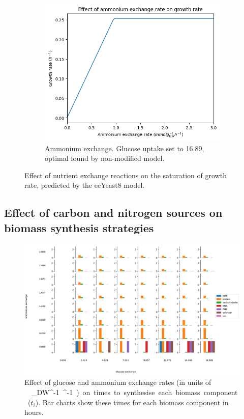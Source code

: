 \begin{figure}
  \begin{subfigure}[htpb]{0.6\textwidth}
  \centering
    \includegraphics[width=\linewidth]{ecYeast8-ammonium-saturation.png}
    \caption{
      Ammonium exchange.
      Glucose uptake set to 16.89, optimal found by non-modified model.}
    \label{fig:model-saturation-ammonium}
  \end{subfigure}
  \caption{
    Effect of nutrient exchange reactions on the saturation of growth rate, predicted by the ecYeast8 model.
  }
  \label{fig:model-saturation}
\end{figure}


\subsection{Effect of carbon and nitrogen sources on biomass synthesis strategies}
\label{subsec:model-grid}

\begin{figure}
  \centering
  \includegraphics[width=0.9\linewidth]{ablation_heatmap_01_barcharts_adapted}
  \caption{
    Effect of glucose and ammonium exchange rates (in units of \SI{}{\milli\mole~\gram_{DW}^{-1}~\hour^{-1}}) on times to synthesise each biomass component ($t_{i}$).
    Bar charts show these times for each biomass component in hours.
  }
  \label{fig:model-barchartgrid}
\end{figure}

